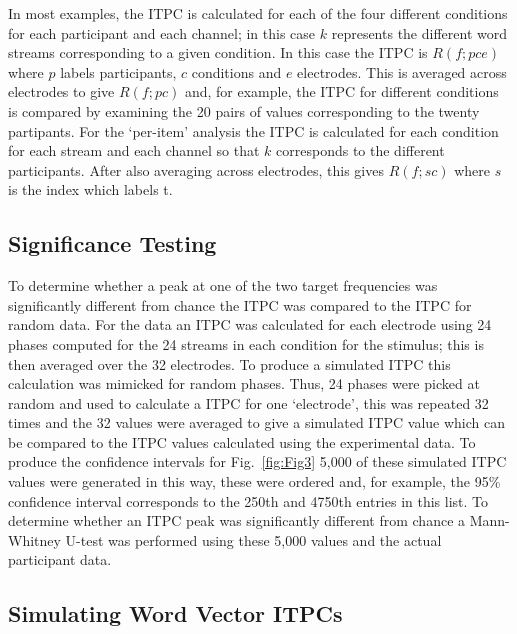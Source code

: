 \documentclass[10pt,letterpaper]{article}
\begin{document}
In most examples, the ITPC is calculated for each of the four
different conditions for each participant and each channel; in this
case $k$ represents the different word streams corresponding to a
given condition. In this case the ITPC is $R(f;pce)$ where $p$ labels
participants, $c$ conditions and $e$ electrodes. This is averaged across
electrodes to give $R(f;pc)$ and, for example, the ITPC for different
conditions is compared by examining the 20 pairs of values
corresponding to the twenty partipants. For the `per-item' analysis
the ITPC is calculated for each condition for each stream and each
channel so that $k$ corresponds to the different participants. After
also averaging across electrodes, this gives $R(f;sc)$ where $s$ is
the index which labels t.

\subsection*{Significance Testing}

To determine whether a peak at one of the two target frequencies was
significantly different from chance the ITPC was compared to the ITPC
for random data. For the data an ITPC was calculated for each
electrode using 24 phases computed for the 24 streams in each
condition for the stimulus; this is then averaged over the 32
electrodes. To produce a simulated ITPC this calculation was mimicked
for random phases. Thus, 24 phases were picked at random and used to
calculate a ITPC for one `electrode', this was repeated 32 times and
the 32 values were averaged to give a simulated ITPC value which can
be compared to the ITPC values calculated using the experimental
data. To produce the confidence intervals for Fig.~\ref{fig:Fig3}
5,000 of these simulated ITPC values were generated in this way, these
were ordered and, for example, the 95\% confidence interval
corresponds to the 250th and 4750th entries in this list. To determine
whether an ITPC peak was significantly different from chance a
Mann-Whitney U-test was performed using these 5,000 values and the
actual participant data.

\subsection*{Simulating Word Vector ITPCs}
\end{document}
